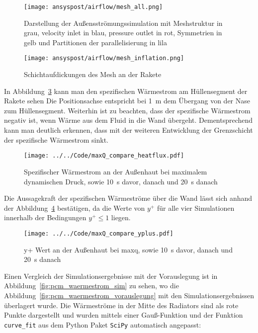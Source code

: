 \begin{figure}
  \centering
  \texttt{[image: ansyspost/airflow/mesh\_all.png]}
  \caption{Darstellung der Außensströmungssimulation mit Meshstruktur in grau, velocity inlet in blau, pressure outlet in rot, Symmetrien in gelb und Partitionen der parallelisierung in lila}\label{fig:aussenstroemung_mesh}
\end{figure}

\begin{figure}
  \centering
  \texttt{[image: ansyspost/airflow/mesh\_inflation.png]}
  \caption{Schichtaufdickungen des Mesh an der Rakete}\label{fig:aussenstroemung_mesh_inflationlayers}
\end{figure}

In Abbildung~\ref{fig:spezifischer_waermestrom_maxQ_simulationen} kann man den spezifischen Wärmestrom am Hüllensegment der Rakete sehen
Die Positionsachse entspricht bei \SI{1}{\meter} dem Übergang von der Nase zum Hüllensegment. Weiterhin ist zu beachten, dass der spezifische Wärmestrom
negativ ist, wenn Wärme aus dem Fluid in die Wand übergeht. Dementsprechend kann man deutlich erkennen, dass mit der weiteren Entwicklung der Grenzschicht
der spezifische Wärmestrom sinkt.

\begin{figure}
  \centering
  \texttt{[image: ../../Code/maxQ\_compare\_heatflux.pdf]}
  \caption{Spezifischer Wärmestrom an der Außenhaut bei maximalem dynamischen Druck, sowie \SI{10}{s} davor, danach und \SI{20}{s} danach}\label{fig:spezifischer_waermestrom_maxQ_simulationen}
\end{figure}

Die Aussagekraft der spezifischen Wärmeströme über die Wand lässt sich anhand der Abbildung~\ref{fig:yplus_maxQ_simulationen} bestätigen, da die Werte von $y^+$
für alle vier Simulationen innerhalb der Bedingungen $y^+ \leq 1$ liegen.

\begin{figure}
  \centering
  \texttt{[image: ../../Code/maxQ\_compare\_yplus.pdf]}
  \caption{y+ Wert an der Außenhaut bei \ac{maxq}, sowie \SI{10}{s} davor, danach und \SI{20}{s} danach}\label{fig:yplus_maxQ_simulationen}
\end{figure}

Einen Vergleich der Simulationsergebnisse mit der Vorauslegung ist in Abbildung~\ref{fig:pcm_waermestrom_sim} zu sehen, wo die Abbildung~\ref{fig:pcm_waermestrom_vorauslegung} mit den
Simulationsergebnissen überlagert wurde. Die Wärmeströme in der Mitte des Radiators sind als rote Punkte dargestellt und wurden mittels einer Gauß-Funktion und der Funktion \texttt{curve\_fit} aus dem
Python Paket \texttt{SciPy} automatisch angepasst:

